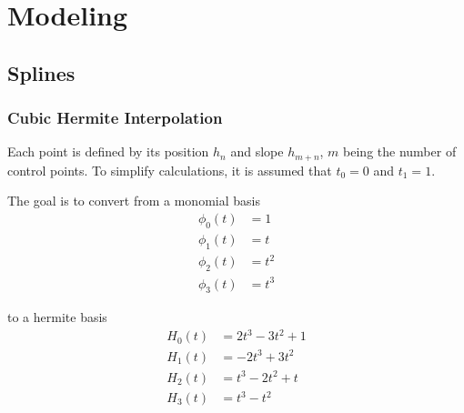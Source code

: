 \documentclass[12pt]{article}
\begin{document}
\newcommand*\dif{\mathop{}\!\mathrm{d}}


\newenvironment{subitemize}
{ \begin{itemize}[leftmargin=\parindent] }
{ \end{itemize} }

\newenvironment{subenumerate}
{ \begin{enumerate}[leftmargin=\parindent] }
{ \end{enumerate} }

\newenvironment{nopagebr}
  {\par\nobreak\vfil\penalty0\vfilneg
   \vtop\bgroup}
  {\par\xdef\tpd{\the\prevdepth}\egroup
   \prevdepth=\tpd}

\tableofcontents

 
\pagebreak

\section{Modeling}

\subsection{Splines}

\subsubsection{Cubic Hermite Interpolation}

Each point is defined by its position $h_n$ and slope $h_{m + n}$, $m$ being the number of control points. To simplify calculations,
it is assumed that $t_0 = 0$ and $t_1 = 1$.

The goal is to convert from a monomial basis
\begin{align*}
    \phi_0(t) &= 1\\
    \phi_1(t) &= t\\
    \phi_2(t) &= t^2\\
    \phi_3(t) &= t^3
\end{align*}

to a hermite basis
\begin{align*}
    H_0(t) &= 2t^3 - 3t^2 + 1\\
    H_1(t) &= -2t^3 + 3t^2\\
    H_2(t) &= t^3 - 2t^2 + t\\
    H_3(t) &= t^3 - t^2
\end{align*}
\end{document}
